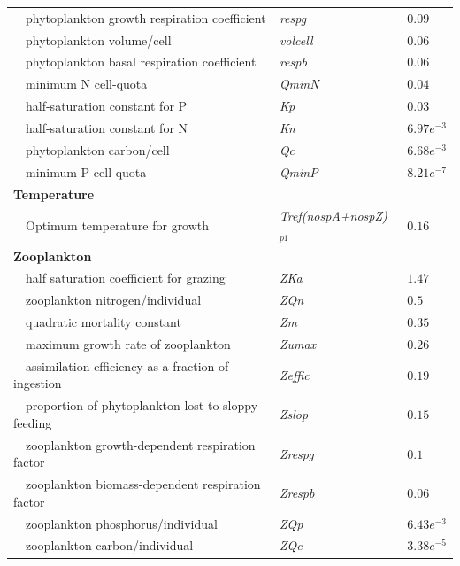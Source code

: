 \documentclass[review]{elsarticle}\usepackage[]{graphicx}\usepackage[]{color}
\begin{document}
\begin{table}[!tbp]
{\begin{center}
\begin{tabular}{lll}
~~phytoplankton growth respiration coefficient&\textit{respg}&$0.09$\tabularnewline
~~phytoplankton volume/cell&\textit{volcell}&$0.06$\tabularnewline
~~phytoplankton basal respiration coefficient&\textit{respb}&$0.06$\tabularnewline
~~minimum N cell-quota&\textit{QminN}&$0.04$\tabularnewline
~~half-saturation constant for P&\textit{Kp}&$0.03$\tabularnewline
~~half-saturation constant for N&\textit{Kn}&$6.97e^{-3}$\tabularnewline
~~phytoplankton carbon/cell&\textit{Qc}&$6.68e^{-3}$\tabularnewline
~~minimum P cell-quota&\textit{QminP}&$8.21e^{-7}$\tabularnewline
\hline
{\bfseries Temperature}&&\tabularnewline
~~Optimum temperature for growth&\textit{Tref(nospA+nospZ)$_{p1}$}&$0.16$\tabularnewline
\hline
{\bfseries Zooplankton}&&\tabularnewline
~~half saturation coefficient for grazing&\textit{ZKa}&$1.47$\tabularnewline
~~zooplankton nitrogen/individual&\textit{ZQn}&$0.5$\tabularnewline
~~quadratic mortality constant&\textit{Zm}&$0.35$\tabularnewline
~~maximum growth rate of zooplankton&\textit{Zumax}&$0.26$\tabularnewline
~~assimilation efficiency as a fraction of ingestion&\textit{Zeffic}&$0.19$\tabularnewline
~~proportion of phytoplankton lost to sloppy feeding&\textit{Zslop}&$0.15$\tabularnewline
~~zooplankton growth-dependent respiration factor&\textit{Zrespg}&$0.1$\tabularnewline
~~zooplankton biomass-dependent respiration factor&\textit{Zrespb}&$0.06$\tabularnewline
~~zooplankton phosphorus/individual&\textit{ZQp}&$6.43e^{-3}$\tabularnewline
~~zooplankton carbon/individual&\textit{ZQc}&$3.38e^{-5}$\tabularnewline
\hline
\end{tabular}\end{center}}
\end{table}


\clearpage

\end{document}
